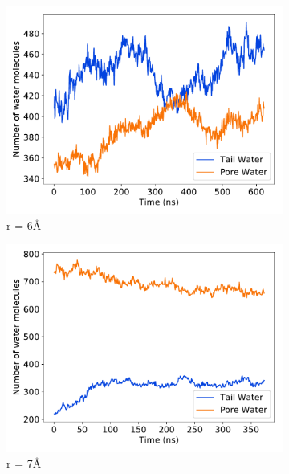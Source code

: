 \documentclass{article}
\begin{document}
\begin{figure}
\begin{subfigure}{0.45\textwidth}
  \includegraphics[width=\linewidth]{r6_gap.pdf}
  \caption{r = 6\AA}\label{fig:r6_gap}
  \end{subfigure}
  \begin{subfigure}{0.45\textwidth}
  \includegraphics[width=\linewidth]{r7_gap.pdf}
  \caption{r = 7\AA}\label{fig:r7_gap}
  \end{subfigure}
  \begin{subfigure}{0.45\textwidth}

\end{subfigure}
\end{figure}
\end{document}
